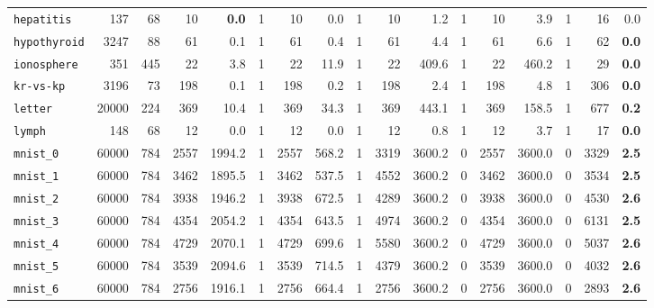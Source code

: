 \begin{tabular}{lccrrrrrrrrrrrrrr}
\texttt{hepatitis} & \multicolumn{1}{r}{137} & \multicolumn{1}{r}{68}  & 10 & \textbf{0.0} & 1 & 10 & 0.0 & 1 & 10 & 1.2 & 1 & 10 & 3.9 & 1 & 16 & 0.0\\
\texttt{hypothyroid} & \multicolumn{1}{r}{3247} & \multicolumn{1}{r}{88}  & 61 & 0.1 & 1 & 61 & 0.4 & 1 & 61 & 4.4 & 1 & 61 & 6.6 & 1 & 62 & \textbf{0.0}\\
\texttt{ionosphere} & \multicolumn{1}{r}{351} & \multicolumn{1}{r}{445}  & 22 & 3.8 & 1 & 22 & 11.9 & 1 & 22 & 409.6 & 1 & 22 & 460.2 & 1 & 29 & \textbf{0.0}\\
\texttt{kr-vs-kp} & \multicolumn{1}{r}{3196} & \multicolumn{1}{r}{73}  & 198 & 0.1 & 1 & 198 & 0.2 & 1 & 198 & 2.4 & 1 & 198 & 4.8 & 1 & 306 & \textbf{0.0}\\
\texttt{letter} & \multicolumn{1}{r}{20000} & \multicolumn{1}{r}{224}  & 369 & 10.4 & 1 & 369 & 34.3 & 1 & 369 & 443.1 & 1 & 369 & 158.5 & 1 & 677 & \textbf{0.2}\\
\texttt{lymph} & \multicolumn{1}{r}{148} & \multicolumn{1}{r}{68}  & 12 & 0.0 & 1 & 12 & 0.0 & 1 & 12 & 0.8 & 1 & 12 & 3.7 & 1 & 17 & \textbf{0.0}\\
\texttt{mnist\_0} & \multicolumn{1}{r}{60000} & \multicolumn{1}{r}{784}  & 2557 & 1994.2 & 1 & 2557 & 568.2 & 1 & 3319 & 3600.2 & 0 & 2557 & 3600.0 & 0 & 3329 & \textbf{2.5}\\
\texttt{mnist\_1} & \multicolumn{1}{r}{60000} & \multicolumn{1}{r}{784}  & 3462 & 1895.5 & 1 & 3462 & 537.5 & 1 & 4552 & 3600.2 & 0 & 3462 & 3600.0 & 0 & 3534 & \textbf{2.5}\\
\texttt{mnist\_2} & \multicolumn{1}{r}{60000} & \multicolumn{1}{r}{784}  & 3938 & 1946.2 & 1 & 3938 & 672.5 & 1 & 4289 & 3600.2 & 0 & 3938 & 3600.0 & 0 & 4530 & \textbf{2.6}\\
\texttt{mnist\_3} & \multicolumn{1}{r}{60000} & \multicolumn{1}{r}{784}  & 4354 & 2054.2 & 1 & 4354 & 643.5 & 1 & 4974 & 3600.2 & 0 & 4354 & 3600.0 & 0 & 6131 & \textbf{2.5}\\
\texttt{mnist\_4} & \multicolumn{1}{r}{60000} & \multicolumn{1}{r}{784}  & 4729 & 2070.1 & 1 & 4729 & 699.6 & 1 & 5580 & 3600.2 & 0 & 4729 & 3600.0 & 0 & 5037 & \textbf{2.6}\\
\texttt{mnist\_5} & \multicolumn{1}{r}{60000} & \multicolumn{1}{r}{784}  & 3539 & 2094.6 & 1 & 3539 & 714.5 & 1 & 4379 & 3600.2 & 0 & 3539 & 3600.0 & 0 & 4032 & \textbf{2.6}\\
\texttt{mnist\_6} & \multicolumn{1}{r}{60000} & \multicolumn{1}{r}{784}  & 2756 & 1916.1 & 1 & 2756 & 664.4 & 1 & 2756 & 3600.2 & 0 & 2756 & 3600.0 & 0 & 2893 & \textbf{2.6}\\

\end{tabular}

